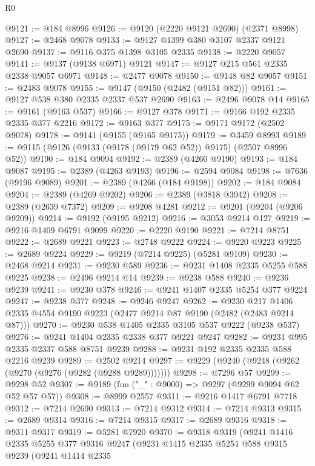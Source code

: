 \begin{lexlean}{R0}
\begin{coremodule}
@9121 := @184 @8996
@9126 := @9120 (@2220 @9121 @2690) (@2371 @8998)
@9127 := @2468 @9078
@9133 := @9127 @1399 @380 @3107 @2337 @9121 @2690
@9137 := @9116 @375 @1398 @3105 @2335
@9138 := @2220 @9057
@9141 := @9137 (@9138 @6971) @9121
@9147 := @9127 @215 @561 @2335 @2338 @9057 @6971
@9148 := @2477 @9078
@9150 := @9148 @82 @9057
@9151 := @2483 @9078
@9155 := @9147 (@9150 (@2482 (@9151 @82)))
@9161 := @9127 @538 @380 @2335 @2337 @537 @2690
@9163 := @2496 @9078 @14
@9165 := @9161 (@9163 @537)
@9166 := @9127 @378
@9171 := @9166 @192 @2335 @2335 @377 @2216
@9172 := @9163 @377
@9175 := @9171 @9172 (@2502 @9078)
@9178 := @9141 (@9155 (@9165 @9175))
@9179 := @3459 @8993
@9189 := @9115 (@9126 (@9133 (@9178 (@9179 @62 @52)) @9175) (@2507 @8996 @52))
@9190 := @184 @9094
@9192 := @2389 (@4260 @9190)
@9193 := @184 @9087
@9195 := @2389 (@4263 @9193)
@9196 := @2594 @9084
@9198 := @7636 (@9196 @9089)
@9201 := @2389 (@4266 (@184 @9198))
@9202 := @184 @9084
@9204 := @2389 (@4269 @9202)
@9206 := @2389 (@3818 @3942)
@9208 := @2389 (@2639 @7372)
@9209 := @9208 @4281
@9212 := @9201 (@9204 (@9206 @9209))
@9214 := @9192 (@9195 @9212)
@9216 := @3053 @9214 @127
@9219 := @9216 @1409 @6791 @9099
@9220 := @2220 @9190
@9221 := @7214 @8751
@9222 := @2689 @9221
@9223 := @2748 @9222
@9224 := @9220 @9223
@9225 := @2689 @9224
@9229 := @9219 (@7214 @9225) (@5281 @9109)
@9230 := @2468 @9214
@9231 := @9230 @589
@9236 := @9231 @1408 @2335 @5255 @588 @9225
@9238 := @2496 @9214 @14
@9239 := @9238 @588
@9240 := @9236 @9239
@9241 := @9230 @378
@9246 := @9241 @1407 @2335 @5254 @377 @9224
@9247 := @9238 @377
@9248 := @9246 @9247
@9262 := @9230 @217 @1406 @2335 @4554 @9190 @9223 (@2477 @9214 @87 @9190 (@2482 (@2483 @9214 @87)))
@9270 := @9230 @538 @1405 @2335 @3105 @537 @9222 (@9238 @537)
@9276 := @9241 @1404 @2335 @2338 @377 @9221 @9247
@9282 := @9231 @995 @2335 @2337 @588 @8751 @9239
@9288 := @9231 @192 @2335 @2335 @588 @2216 @9239
@9289 := @2502 @9214
@9297 := @9229 (@9240 (@9248 (@9262 (@9270 (@9276 (@9282 (@9288 @9289)))))))
@9298 := @7296 @57
@9299 := @9298 @52
@9307 := @9189 (fun ("_" : @9000) => @9297 (@9299 @9094 @62 @52 @57 @57))
@9308 := @8999 @2557
@9311 := @9216 @1417 @6791 @7718
@9312 := @7214 @2690
@9313 := @7214 @9312
@9314 := @7214 @9313
@9315 := @2689 @9314
@9316 := @7214 @9315
@9317 := @2689 @9316
@9318 := @9311 @9317
@9319 := @5281 @7920
@9370 := @9318
    @9319
    (@9241
      @1416
      @2335
      @5255
      @377
      @9316
      @9247
      (@9231
        @1415
        @2335
        @5254
        @588
        @9315
        @9239
        (@9241
          @1414
          @2335

\end{coremodule}
\end{lexlean}
